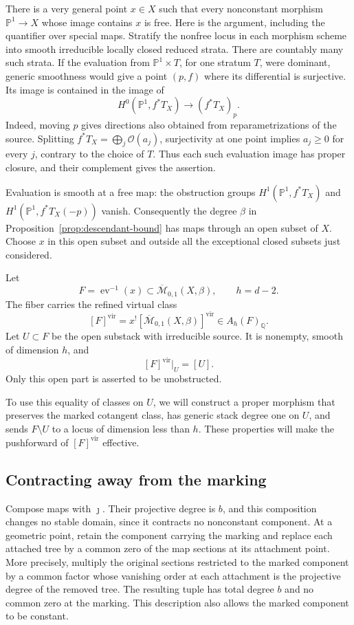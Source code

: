 There is a very general point \(x\in X\) such that every nonconstant
morphism \(\mathbb P^1\to X\) whose image contains \(x\) is free.
Here is the argument, including the quantifier over special maps.
Stratify the nonfree locus in each morphism scheme into smooth
irreducible locally closed reduced strata.  There are countably many
such strata.  If the evaluation from \(\mathbb P^1\times T\), for one
stratum \(T\), were dominant, generic smoothness would give a point
\((p,f)\) where its differential is surjective.  Its image is contained
in the image of
\[
  H^0(\mathbb P^1,f^*T_X)\longrightarrow(f^*T_X)_p.
\]
Indeed, moving \(p\) gives directions also obtained from
reparametrizations of the source.  Splitting
\(f^*T_X=\bigoplus_j\mathcal O(a_j)\), surjectivity at one point implies
\(a_j\ge0\) for every \(j\), contrary to the choice of \(T\).
Thus each such evaluation image has proper closure, and their
complement gives the assertion.

Evaluation is smooth at a free map: the obstruction groups
\(H^1(\mathbb P^1,f^*T_X)\) and
\(H^1(\mathbb P^1,f^*T_X(-p))\) vanish.  Consequently the degree
\(\beta\) in Proposition~\ref{prop:descendant-bound} has maps
through an open subset of \(X\).  Choose \(x\) in this open subset and
outside all the exceptional closed subsets just considered.

Let
\[
  F=\operatorname{ev}^{-1}(x)
    \subset\overline{\mathcal M}_{0,1}(X,\beta),\qquad h=d-2.
\]
The fiber carries the refined virtual class
\[
  [F]^{\mathrm{vir}}
  =x^![\overline{\mathcal M}_{0,1}(X,\beta)]^{\mathrm{vir}}
  \in A_h(F)_{\mathbb Q}.
\]
Let \(U\subset F\) be the open substack with irreducible source.
It is nonempty, smooth of dimension \(h\), and
\[
  [F]^{\mathrm{vir}}|_U=[U].
\]
Only this open part is asserted to be unobstructed.

To use this equality of classes on \(U\), we will construct a proper
morphism that preserves the marked cotangent class, has generic stack
degree one on \(U\), and sends \(F\setminus U\) to a locus of
dimension less than \(h\).  These properties will make the
pushforward of \([F]^{\mathrm{vir}}\) effective.

\subsection{Contracting away from the marking}

Compose maps with \(\jmath\).  Their projective degree is \(b\), and
this composition changes no stable domain, since it contracts no
nonconstant component.  At a geometric point, retain the component
carrying the marking and replace each attached tree by a common zero
of the map sections at its attachment point.  More precisely, multiply
the original sections restricted to the marked component by a common
factor whose vanishing order at each attachment is the projective
degree of the removed tree.  The resulting tuple has total degree
\(b\) and no common zero at the marking.  This description also
allows the marked component to be constant.

